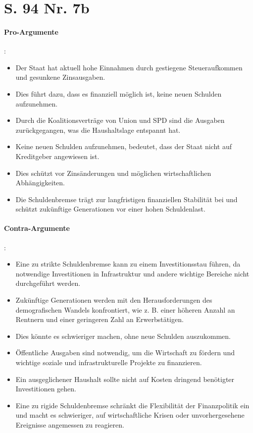 \documentclass[12pt,a4paper]{report}
\begin{document}
	\section{S. 94 Nr. 7b}
	\paragraph{Pro-Argumente}:
	\begin{itemize}
		\item Der Staat hat aktuell hohe Einnahmen durch gestiegene Steueraufkommen und gesunkene Zinsausgaben.
		\item Dies führt dazu, dass es finanziell möglich ist, keine neuen Schulden aufzunehmen.
		\item Durch die Koalitionsverträge von Union und SPD sind die Ausgaben zurückgegangen, was die Haushaltslage entspannt hat.
		\item Keine neuen Schulden aufzunehmen, bedeutet, dass der Staat nicht auf Kreditgeber angewiesen ist.
		\item Dies schützt vor Zinsänderungen und möglichen wirtschaftlichen Abhängigkeiten.
		\item Die Schuldenbremse trägt zur langfristigen finanziellen Stabilität bei und schützt zukünftige Generationen vor einer hohen Schuldenlast.
	\end{itemize}
	
	\paragraph{Contra-Argumente}:
	\begin{itemize}
		\item Eine zu strikte Schuldenbremse kann zu einem Investitionsstau führen, da notwendige Investitionen in Infrastruktur und andere wichtige Bereiche nicht durchgeführt werden.
		\item Zukünftige Generationen werden mit den Herausforderungen des demografischen Wandels konfrontiert, wie z. B. einer höheren Anzahl an Rentnern und einer geringeren Zahl an Erwerbstätigen.
		\item Dies könnte es schwieriger machen, ohne neue Schulden auszukommen.
		\item Öffentliche Ausgaben sind notwendig, um die Wirtschaft zu fördern und wichtige soziale und infrastrukturelle Projekte zu finanzieren.
		\item Ein ausgeglichener Haushalt sollte nicht auf Kosten dringend benötigter Investitionen gehen.
		\item Eine zu rigide Schuldenbremse schränkt die Flexibilität der Finanzpolitik ein und macht es schwieriger, auf wirtschaftliche Krisen oder unvorhergesehene Ereignisse angemessen zu reagieren.
	\end{itemize}
\end{document}
